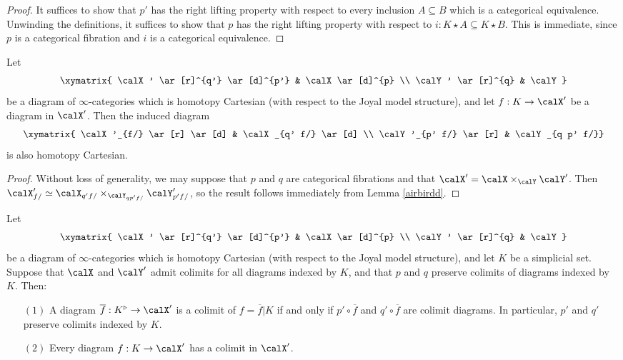 \begin{proof}
It suffices to show that $p'$ has the right lifting property with respect to every inclusion
$A \subseteq B$ which is a categorical equivalence. Unwinding the definitions, it suffices
to show that $p$ has the right lifting property with respect to $i: K \star A \subseteq K \star B$.
This is immediate, since $p$ is a categorical fibration and $i$ is a categorical equivalence.
\end{proof}

\begin{lemma}\label{airbird}
Let $$ \xymatrix{ \calX' \ar[r]^{q'} \ar[d]^{p'} & \calX \ar[d]^{p} \\
\calY' \ar[r]^{q} & \calY }$$
be a diagram of $\infty$-categories which is homotopy Cartesian (with respect to the Joyal model structure), and let $f: K \rightarrow \calX'$ be a diagram in $\calX'$. Then the induced
diagram
$$ \xymatrix{ \calX'_{f/} \ar[r] \ar[d] & \calX_{q'  f/} \ar[d] \\
\calY'_{p'  f/} \ar[r] & \calY_{q  p'  f/}}$$
is also homotopy Cartesian.
\end{lemma}

\begin{proof}
Without loss of generality, we may suppose that $p$ and $q$ are categorical fibrations
and that $\calX' = \calX \times_{\calY} \calY'$. Then $\calX'_{f/} \simeq
\calX_{q'  f/} \times_{ \calY_{q  p'  f/} } \calY'_{p'  f/}$, so the result
follows immediately from Lemma \ref{airbirdd}.
\end{proof}

\begin{lemma}\label{bird3}
Let $$ \xymatrix{ \calX' \ar[r]^{q'} \ar[d]^{p'} & \calX \ar[d]^{p} \\
\calY' \ar[r]^{q} & \calY }$$
be a diagram of $\infty$-categories which is homotopy Cartesian (with respect to the Joyal model structure), and let $K$ be a simplicial set. Suppose that $\calX$ and $\calY'$ admit colimits for all diagrams indexed by $K$, and that $p$ and $q$ preserve colimits of diagrams indexed by $K$. 
Then:
\begin{itemize}
\item[$(1)$] A diagram $\overline{f}: K^{\triangleright} \rightarrow \calX'$ is a colimit of $f=\overline{f}|K$ if and only if
$p' \circ \overline{f}$ and $q' \circ \overline{f}$ are colimit diagrams. In particular, 
$p'$ and $q'$ preserve colimits indexed by $K$.
\item[$(2)$] Every diagram $f: K \rightarrow \calX'$ has a colimit in $\calX'$.
\end{itemize}
\end{lemma}

